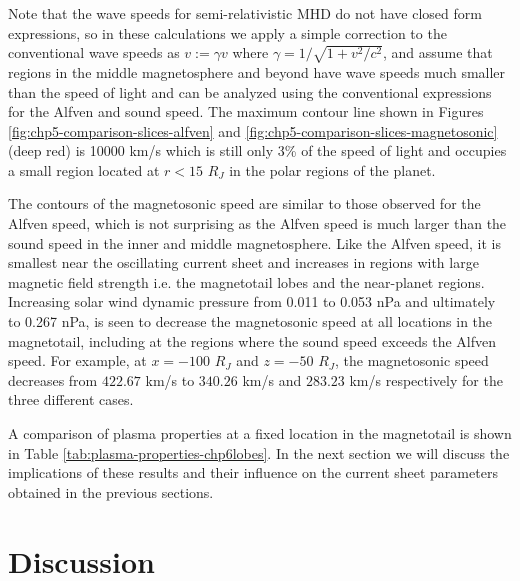 Note that the wave speeds for semi-relativistic MHD do not have closed form expressions, so in these calculations we apply a simple correction to the conventional wave speeds as $v := \gamma v$ where $\gamma = 1/\sqrt{1+v^2/c^2}$, and assume that regions in the middle magnetosphere and beyond have wave speeds much smaller than the speed of light and can be analyzed using the conventional expressions for the Alfven and sound speed. The maximum contour line shown in Figures \ref{fig:chp5-comparison-slices-alfven} and \ref{fig:chp5-comparison-slices-magnetosonic} (deep red) is 10000 km/s which is still only 3\% of the speed of light and occupies a small region located at $r < 15$ $R_J$ in the polar regions of the planet. 

The contours of the magnetosonic speed are similar to those observed for the Alfven speed, which is not surprising as the Alfven speed is much larger than the sound speed in the inner and middle magnetosphere. Like the Alfven speed, it is smallest near the oscillating current sheet and increases in regions with large magnetic field strength i.e. the magnetotail lobes and the near-planet regions. Increasing solar wind dynamic pressure from 0.011 to 0.053 nPa and ultimately to 0.267 nPa, is seen to decrease the magnetosonic speed at all locations in the magnetotail, including at the regions where the sound speed exceeds the Alfven speed. For example, at $x=-100$ $R_J$ and $z=-50$ $R_J$, the magnetosonic speed decreases from $422.67$ km/s to $340.26$ km/s and $283.23$ km/s respectively for the three different cases. 

A comparison of plasma properties at a fixed location in the magnetotail is shown in Table \ref{tab:plasma-properties-chp6lobes}. In the next section we will discuss the implications of these results and their influence on the current sheet parameters obtained in the previous sections. 

\section{Discussion}

